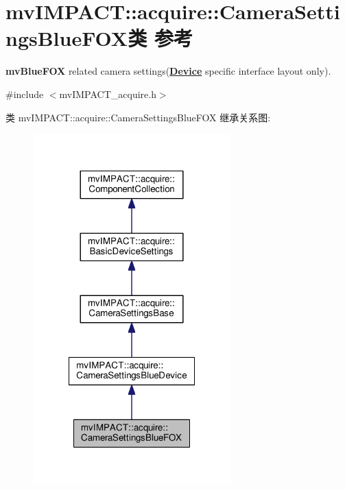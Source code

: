 \hypertarget{classmv_i_m_p_a_c_t_1_1acquire_1_1_camera_settings_blue_f_o_x}{\section{mv\+I\+M\+P\+A\+C\+T\+:\+:acquire\+:\+:Camera\+Settings\+Blue\+F\+O\+X类 参考}
\label{classmv_i_m_p_a_c_t_1_1acquire_1_1_camera_settings_blue_f_o_x}
}


{\bfseries mv\+Blue\+F\+O\+X} related camera settings({\bfseries \hyperlink{classmv_i_m_p_a_c_t_1_1acquire_1_1_device}{Device}} specific interface layout only).  




{\ttfamily \#include $<$mv\+I\+M\+P\+A\+C\+T\+\_\+acquire.\+h$>$}



类 mv\+I\+M\+P\+A\+C\+T\+:\+:acquire\+:\+:Camera\+Settings\+Blue\+F\+O\+X 继承关系图\+:
\nopagebreak
\begin{figure}[H]
\begin{center}
\leavevmode
\includegraphics[width=216pt]{classmv_i_m_p_a_c_t_1_1acquire_1_1_camera_settings_blue_f_o_x__inherit__graph}
\end{center}
\end{figure}


